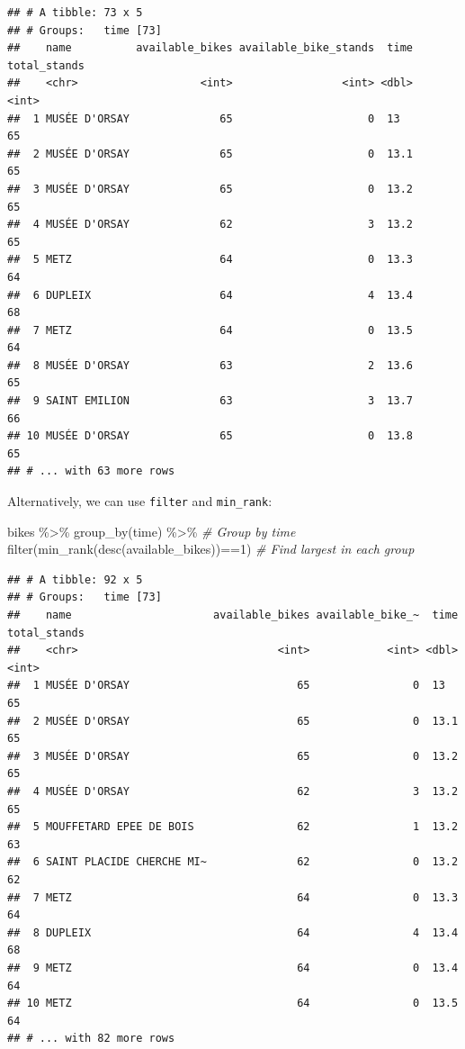 \documentclass[
]{book}
\newenvironment{Shaded}{\begin{snugshade}}{\end{snugshade}}
\newcommand{\CommentTok}[1]{\textcolor[rgb]{0.56,0.35,0.01}{\textit{#1}}}
\newcommand{\DecValTok}[1]{\textcolor[rgb]{0.00,0.00,0.81}{#1}}
\newcommand{\FunctionTok}[1]{\textcolor[rgb]{0.00,0.00,0.00}{#1}}
\newcommand{\NormalTok}[1]{#1}
\newcommand{\SpecialCharTok}[1]{\textcolor[rgb]{0.00,0.00,0.00}{#1}}
\begin{document}
\begin{verbatim}
## # A tibble: 73 x 5
## # Groups:   time [73]
##    name          available_bikes available_bike_stands  time total_stands
##    <chr>                   <int>                 <int> <dbl>        <int>
##  1 MUSÉE D'ORSAY              65                     0  13             65
##  2 MUSÉE D'ORSAY              65                     0  13.1           65
##  3 MUSÉE D'ORSAY              65                     0  13.2           65
##  4 MUSÉE D'ORSAY              62                     3  13.2           65
##  5 METZ                       64                     0  13.3           64
##  6 DUPLEIX                    64                     4  13.4           68
##  7 METZ                       64                     0  13.5           64
##  8 MUSÉE D'ORSAY              63                     2  13.6           65
##  9 SAINT EMILION              63                     3  13.7           66
## 10 MUSÉE D'ORSAY              65                     0  13.8           65
## # ... with 63 more rows
\end{verbatim}

Alternatively, we can use \texttt{filter} and \texttt{min\_rank}:

\begin{Shaded}
\begin{Highlighting}[]
\NormalTok{bikes }\SpecialCharTok{\%\textgreater{}\%}                                     
  \FunctionTok{group\_by}\NormalTok{(time) }\SpecialCharTok{\%\textgreater{}\%}                           \CommentTok{\# Group by time}
  \FunctionTok{filter}\NormalTok{(}\FunctionTok{min\_rank}\NormalTok{(}\FunctionTok{desc}\NormalTok{(available\_bikes))}\SpecialCharTok{==}\DecValTok{1}\NormalTok{)   }\CommentTok{\# Find largest in each group}
\end{Highlighting}
\end{Shaded}

\begin{verbatim}
## # A tibble: 92 x 5
## # Groups:   time [73]
##    name                      available_bikes available_bike_~  time total_stands
##    <chr>                               <int>            <int> <dbl>        <int>
##  1 MUSÉE D'ORSAY                          65                0  13             65
##  2 MUSÉE D'ORSAY                          65                0  13.1           65
##  3 MUSÉE D'ORSAY                          65                0  13.2           65
##  4 MUSÉE D'ORSAY                          62                3  13.2           65
##  5 MOUFFETARD EPEE DE BOIS                62                1  13.2           63
##  6 SAINT PLACIDE CHERCHE MI~              62                0  13.2           62
##  7 METZ                                   64                0  13.3           64
##  8 DUPLEIX                                64                4  13.4           68
##  9 METZ                                   64                0  13.4           64
## 10 METZ                                   64                0  13.5           64
## # ... with 82 more rows
\end{verbatim}
\end{document}
